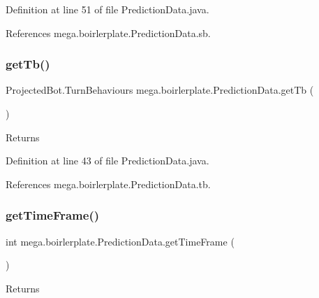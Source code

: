 Definition at line 51 of file Prediction\+Data.\+java.



References mega.\+boirlerplate.\+Prediction\+Data.\+sb.

\mbox{\label{classmega_1_1boirlerplate_1_1_prediction_data_a1247004add226576ee0bd23f019457a9}} 
\subsubsection{\texorpdfstring{get\+Tb()}{getTb()}}
{\footnotesize\ttfamily Projected\+Bot.\+Turn\+Behaviours mega.\+boirlerplate.\+Prediction\+Data.\+get\+Tb (\begin{DoxyParamCaption}{ }\end{DoxyParamCaption})}

\begin{DoxyReturn}{Returns}

\end{DoxyReturn}


Definition at line 43 of file Prediction\+Data.\+java.



References mega.\+boirlerplate.\+Prediction\+Data.\+tb.

\mbox{\label{classmega_1_1boirlerplate_1_1_prediction_data_a01d74b9bc67539cc279f927624479544}} 
\subsubsection{\texorpdfstring{get\+Time\+Frame()}{getTimeFrame()}}
{\footnotesize\ttfamily int mega.\+boirlerplate.\+Prediction\+Data.\+get\+Time\+Frame (\begin{DoxyParamCaption}{ }\end{DoxyParamCaption})}

\begin{DoxyReturn}{Returns}

\end{DoxyReturn}


